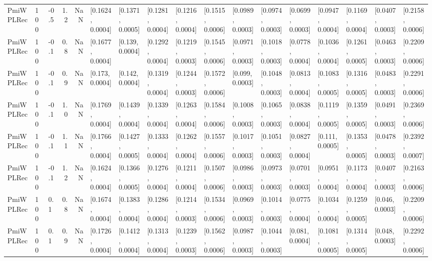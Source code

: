 \begin{tabular}{lllrrllllllllllll}
 PmiWPLRec &  100 &  -0.5 &   1.2 &   NaN &  [0.1624, 0.0004] &  [0.1371, 0.0005] &  [0.1281, 0.0004] &  [0.1216, 0.0004] &  [0.1515, 0.0006] &  [0.0989, 0.0003] &  [0.0974, 0.0003] &  [0.0699, 0.0003] &  [0.0947, 0.0004] &  [0.1169, 0.0004] &  [0.0407, 0.0003] &  [0.2158, 0.0006] \\
 PmiWPLRec &  100 &  -0.1 &   0.8 &   NaN &  [0.1677, 0.0004] &   [0.139, 0.0004] &  [0.1292, 0.0004] &  [0.1219, 0.0003] &  [0.1545, 0.0006] &  [0.0971, 0.0003] &  [0.1018, 0.0003] &  [0.0778, 0.0004] &  [0.1036, 0.0004] &  [0.1261, 0.0005] &  [0.0463, 0.0003] &  [0.2209, 0.0006] \\
 PmiWPLRec &  100 &  -0.1 &   0.9 &   NaN &   [0.173, 0.0004] &   [0.142, 0.0004] &  [0.1319, 0.0004] &  [0.1244, 0.0003] &  [0.1572, 0.0006] &   [0.099, 0.0003] &  [0.1048, 0.0003] &  [0.0813, 0.0004] &  [0.1083, 0.0005] &  [0.1316, 0.0005] &  [0.0483, 0.0003] &  [0.2291, 0.0006] \\
 PmiWPLRec &  100 &  -0.1 &   1.0 &   NaN &  [0.1769, 0.0004] &  [0.1439, 0.0004] &  [0.1339, 0.0004] &  [0.1263, 0.0004] &  [0.1584, 0.0006] &  [0.1008, 0.0003] &  [0.1065, 0.0003] &  [0.0838, 0.0004] &  [0.1119, 0.0005] &  [0.1359, 0.0005] &  [0.0491, 0.0003] &  [0.2369, 0.0006] \\
 PmiWPLRec &  100 &  -0.1 &   1.1 &   NaN &  [0.1766, 0.0004] &  [0.1427, 0.0005] &  [0.1333, 0.0004] &  [0.1262, 0.0004] &  [0.1557, 0.0006] &  [0.1017, 0.0003] &  [0.1051, 0.0003] &  [0.0827, 0.0004] &   [0.111, 0.0005] &  [0.1353, 0.0005] &  [0.0478, 0.0003] &  [0.2392, 0.0007] \\
 PmiWPLRec &  100 &  -0.1 &   1.2 &   NaN &  [0.1624, 0.0004] &  [0.1366, 0.0005] &  [0.1276, 0.0004] &  [0.1211, 0.0004] &  [0.1507, 0.0006] &  [0.0986, 0.0003] &  [0.0973, 0.0003] &  [0.0701, 0.0003] &  [0.0951, 0.0004] &  [0.1173, 0.0004] &  [0.0407, 0.0003] &  [0.2163, 0.0006] \\
 PmiWPLRec &  100 &   0.1 &   0.8 &   NaN &  [0.1674, 0.0004] &  [0.1383, 0.0004] &  [0.1286, 0.0004] &  [0.1214, 0.0003] &  [0.1534, 0.0006] &  [0.0969, 0.0003] &  [0.1014, 0.0003] &  [0.0775, 0.0004] &  [0.1034, 0.0004] &  [0.1259, 0.0005] &   [0.046, 0.0003] &  [0.2209, 0.0006] \\
 PmiWPLRec &  100 &   0.1 &   0.9 &   NaN &  [0.1726, 0.0004] &  [0.1412, 0.0004] &  [0.1313, 0.0004] &  [0.1239, 0.0003] &  [0.1562, 0.0006] &  [0.0987, 0.0003] &  [0.1044, 0.0003] &   [0.081, 0.0004] &  [0.1081, 0.0005] &  [0.1314, 0.0005] &   [0.048, 0.0003] &  [0.2292, 0.0006] \\

\end{tabular}
